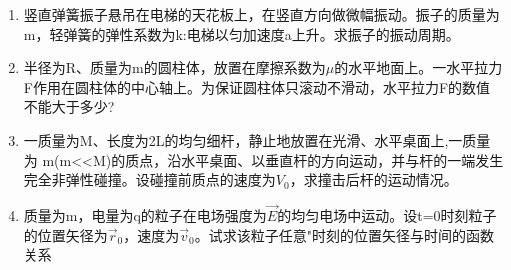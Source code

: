 
\begin{enumerate}
\item 竖直弹簧振子悬吊在电梯的天花板上，在竖直方向做微幅振动。振子的质量为m，轻弹簧的弹性系数为k:电梯以匀加速度a上升。求振子的振动周期。
\item 半径为R、质量为m的圆柱体，放置在摩擦系数为$\mu$的水平地面上。一水平拉力F作用在圆柱体的中心轴上。为保证圆柱体只滚动不滑动，水平拉力F的数值不能大于多少?
\item 一质量为M、长度为2L的均匀细杆，静止地放置在光滑、水平桌面上,一质量为 m(m<<M)的质点，沿水平桌面、以垂直杆的方向运动，并与杆的一端发生完全非弹性碰撞。设碰撞前质点的速度为$V_0$，求撞击后杆的运动情况。
\item 质量为m，电量为q的粒子在电场强度为$\vec E$的均匀电场中运动。设t=0时刻粒子的位置矢径为$\vec r_0$，速度为$\vec v_0$。试求该粒子任意"时刻的位置矢径与时间的函数关系
\end{enumerate}